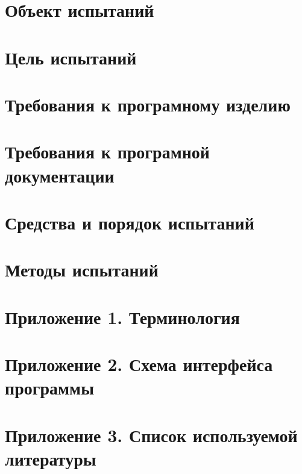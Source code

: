 \documentclass[
encoding=utf8
]{../twoeskd}
\begin{document}

% 

\newpage
{}
\tableofcontents

\newpage
\section{Объект испытаний}


\newpage
\section{Цель испытаний}


\newpage
\section{Требования к програмному изделию}


\newpage
\section{Требования к програмной документации}


\newpage
\section{Средства и порядок испытаний}


\newpage
\section{Методы испытаний}


\newpage
\section{Приложение 1. Терминология}


\newpage
\section{Приложение 2. Схема интерфейса программы}


\newpage
\section{Приложение 3. Список используемой литературы}



\newpage
\eskdListOfChanges

\end{document}
